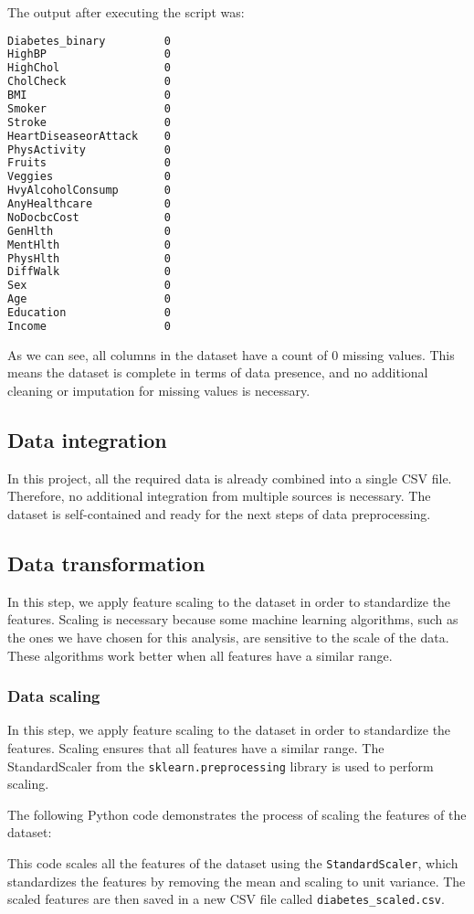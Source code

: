 The output after executing the script was:

\begin{lstlisting}[language=bash]
Diabetes_binary         0
HighBP                  0
HighChol                0
CholCheck               0
BMI                     0
Smoker                  0
Stroke                  0
HeartDiseaseorAttack    0
PhysActivity            0
Fruits                  0
Veggies                 0
HvyAlcoholConsump       0
AnyHealthcare           0
NoDocbcCost             0
GenHlth                 0
MentHlth                0
PhysHlth                0
DiffWalk                0
Sex                     0
Age                     0
Education               0
Income                  0
\end{lstlisting}

As we can see, all columns in the dataset have a count of 0 missing values. This means the dataset is complete in terms of data presence, and no additional cleaning or imputation for missing values is necessary.

\subsection{Data integration}
In this project, all the required data is already combined into a single CSV file. Therefore, no additional integration from multiple sources is necessary. The dataset is self-contained and ready for the next steps of data preprocessing.

\subsection{Data transformation}

In this step, we apply feature scaling to the dataset in order to standardize the features. Scaling is necessary because some machine learning algorithms, such as the ones we have chosen for this analysis, are sensitive to the scale of the data. These algorithms work better when all features have a similar range.

\subsubsection{Data scaling}

In this step, we apply feature scaling to the dataset in order to standardize the features. Scaling ensures that all features have a similar range. The StandardScaler from the \texttt{sklearn.preprocessing} library is used to perform scaling.

The following Python code demonstrates the process of scaling the features of the dataset:




This code scales all the features of the dataset using the \texttt{StandardScaler}, which standardizes the features by removing the mean and scaling to unit variance. The scaled features are then saved in a new CSV file called \texttt{diabetes\_scaled.csv}. 
